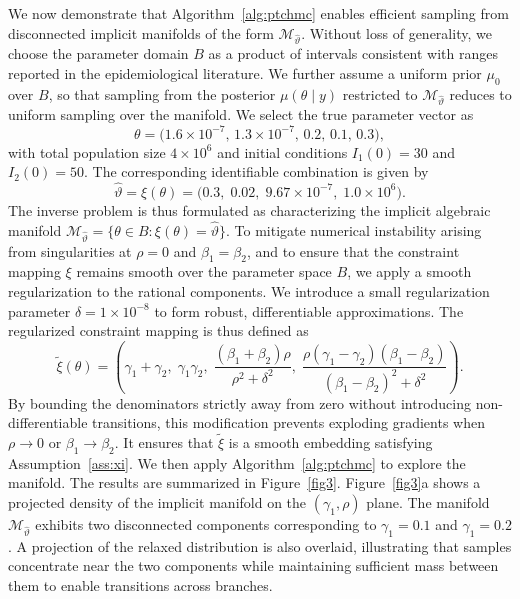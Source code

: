 \documentclass[12pt]{article}
\begin{document}
We now demonstrate that Algorithm~\ref{alg:ptchmc} enables efficient sampling from disconnected implicit manifolds of the form $\mathcal{M}_{\widehat{\vartheta}}$. Without loss of generality, we choose the parameter domain $B$ as a product of intervals consistent with ranges reported in the epidemiological literature. We further assume a uniform prior $\mu_0$ over $B$, so that sampling from the posterior $\mu(\theta \mid y)$ restricted to $\mathcal{M}_{\widehat{\vartheta}}$ reduces to uniform sampling over the manifold.
We select the true parameter vector as
\[
\theta = \bigl(1.6\times 10^{-7},\, 1.3\times 10^{-7},\, 0.2,\, 0.1,\, 0.3\bigr),
\]
with total population size $4\times 10^6$ and initial conditions $I_1(0)=30$ and $I_2(0)=50$. The corresponding identifiable combination is given by
\[
\widehat{\vartheta} = \xi(\theta) = \bigl(0.3,\; 0.02,\; 9.67 \times 10^{-7},\; 1.0 \times 10^{6}\bigr).
\]
The inverse problem is thus formulated as characterizing the implicit algebraic manifold
\(
\mathcal{M}_{\widehat{\vartheta}} = \bigl\{ \theta \in B : \xi(\theta) = \widehat{\vartheta} \bigr\}.
\)
To mitigate numerical instability arising from singularities at \(\rho = 0\) and \(\beta_1 = \beta_2\), and to ensure that the constraint mapping \(\xi\) remains smooth over the parameter space \(B\), we apply a smooth regularization to the rational components. We introduce a small regularization parameter \(\delta = 1 \times 10^{-8}\) to form robust, differentiable approximations. The regularized constraint mapping is thus defined as
\[
\tilde{\xi}(\theta) = 
\left(
\gamma_1 + \gamma_2,\;
\gamma_1 \gamma_2,\;
\frac{(\beta_1 + \beta_2)\rho}{\rho^2 + \delta^2},\;
\frac{\rho(\gamma_1 - \gamma_2)(\beta_1 - \beta_2)}{(\beta_1 - \beta_2)^2 + \delta^2}
\right).
\]
By bounding the denominators strictly away from zero without introducing non-differentiable transitions, this modification prevents exploding gradients when \(\rho \rightarrow 0\) or \(\beta_1 \rightarrow \beta_2\). It ensures that \(\tilde{\xi}\) is a smooth embedding satisfying Assumption~\ref{ass:xi}. We then apply Algorithm~\ref{alg:ptchmc} to explore the manifold. The results are summarized in Figure~\ref{fig3}.
Figure~\ref{fig3}a shows a projected density of the implicit manifold on the $(\gamma_1,\rho)$ plane. The manifold $\mathcal{M}_{\widehat{\vartheta}} $ exhibits two disconnected components corresponding to $\gamma_1 = 0.1$ and $\gamma_1 = 0.2$. A projection of the relaxed distribution is also overlaid, illustrating that samples concentrate near the two components while maintaining sufficient mass between them to enable transitions across branches.
\end{document}
